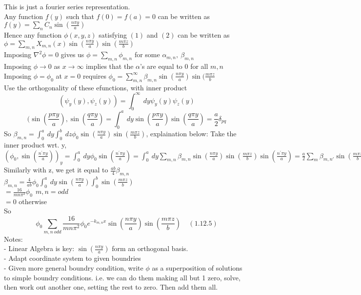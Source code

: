 \documentclass[a4paper,11pt]{article}
\newcommand{\lap}{\nabla^2}
\begin{document}
{This is just a fourier series representation.\\
Any function $f(y)$ such that $f(0)=f(a)=0$ can be written as $f(y)=\sum_n C_n \sin(\frac{n\pi y}{a})$\\
Hence any function $\phi(x,y,z)$ satisfying $(1)$ and $(2)$ can be written as $\phi=\sum_{m,n}X_{m,n}(x)\sin(\frac{n\pi y}{a})\sin(\frac{m\pi z}{b})$\\
Imposing $\lap\phi=0$ gives us $\phi=\sum_{m,n}\phi_{m,n}$ for some $\alpha_{m,n},~\beta_{m,n}$\\
Imposing $\phi\rightarrow 0$ as $x\rightarrow \infty$ implies that the $\alpha$'s are equal to 0 for all $m,n$\\
Imposing $\phi=\phi_0$ at $x=0$ requires $\phi_0=\sum^\infty_{m,n} \beta_{m,n}\sin(\frac{n\pi y}{a})\sin(\frac{m\pi z}{b}$\\
Use the orthogonality of these efunctions, with inner product
$$(\psi_y(y), \psi_z(y))=\int^\infty_0~dy \psi_y(y)\psi_z(y)$$
$$(\sin(\frac{p\pi y}{a}),\sin(\frac{q\pi y}{a})=\int^a_0~dy \sin(\frac{p\pi y}{a})\sin(\frac{q\pi y}{a})=\frac{a}{2}\delta_{pq}$$
So $\beta_{m,n}=\int^a_0~dy\int^b_0~dz \phi_0\sin(\frac{n\pi y}{a})\sin(\frac{m\pi z}{b})$, explaination below:
Take the inner product wrt. y, $(\phi_0,\sin(\frac{n^\prime\pi y}{a}))_y=\int^a_0~dy \phi_0\sin(\frac{n^\prime \pi y}{a})=\int^a_0~dy\sum_{m,n}\beta_{m,n}\sin(\frac{n\pi y}{a})\sin(\frac{m\pi z}{b})\sin(\frac{n^\prime\pi y}{a})=\frac{a}{2}\sum_m\beta_{m,n\prime}\sin(\frac{m\pi z}{b})$\\
Similarly with z, we get it equal to $\frac{ab}{4}\beta_{m,n}$\\
$\beta_{m,n}=\frac{4}{ab}\phi_0\int^a_0~dy \sin(\frac{n\pi y}{a})\int^b_0 \sin(\frac{m\pi z}{b})$\\
$=\frac{16}{mn\pi^2}\phi_0~~m,n=odd$\\
$=0$ otherwise\\
So 
$$\phi_0\sum_{m,n~odd}\frac{16}{mn\pi^2}\phi_0e^{-k_{m,n}x}\sin(\frac{n\pi y}{a})\sin(\frac{m\pi z}{b})~~~~~(1.12.5)$$
Notes:\\ 
- Linear Algebra is key: $\sin(\frac{n\pi y}{a})$ form an orthogonal basis.\\
- Adapt coordinate system to given boundries\\
- Given more general boundry condition, write $\phi$ as a superposition of solutions to simple boundry conditions. i.e. we can do them making all but 1 zero,  solve, then work out another one, setting the rest to zero. Then add them all.\\
}
\end{document}
